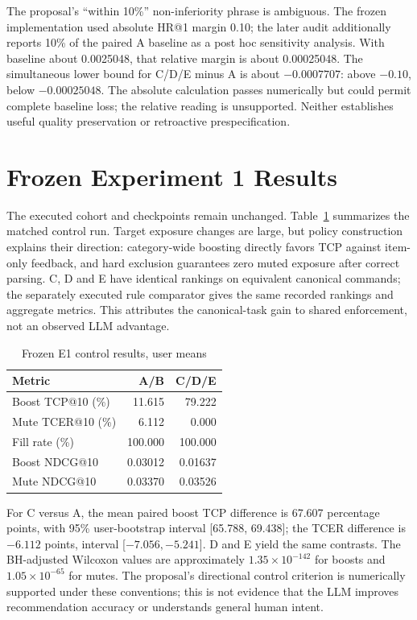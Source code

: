 \documentclass[conference]{IEEEtran}
\begin{document}
The proposal's ``within 10\%'' non-inferiority phrase is ambiguous. The frozen implementation used absolute HR@1 margin 0.10; the later audit additionally reports 10\% of the paired A baseline as a post hoc sensitivity analysis. With baseline about 0.0025048, that relative margin is about 0.00025048. The simultaneous lower bound for C/D/E minus A is about $-0.0007707$: above $-0.10$, below $-0.00025048$. The absolute calculation passes numerically but could permit complete baseline loss; the relative reading is unsupported. Neither establishes useful quality preservation or retroactive prespecification.

\section{Frozen Experiment 1 Results}
The executed cohort and checkpoints remain unchanged. Table~\ref{tab:e1} summarizes the matched control run. Target exposure changes are large, but policy construction explains their direction: category-wide boosting directly favors TCP against item-only feedback, and hard exclusion guarantees zero muted exposure after correct parsing. C, D and E have identical rankings on equivalent canonical commands; the separately executed rule comparator gives the same recorded rankings and aggregate metrics. This attributes the canonical-task gain to shared enforcement, not an observed LLM advantage.

\begin{table}[t]\centering\small
\caption{Frozen E1 control results, user means}\label{tab:e1}
\begin{tabular}{lrr}\toprule
Metric & A/B & C/D/E\\\midrule
Boost TCP@10 (\%) &11.615&79.222\\
Mute TCER@10 (\%) &6.112&0.000\\
Fill rate (\%) &100.000&100.000\\
Boost NDCG@10 &0.03012&0.01637\\
Mute NDCG@10 &0.03370&0.03526\\\bottomrule
\end{tabular}\end{table}

For C versus A, the mean paired boost TCP difference is 67.607 percentage points, with 95\% user-bootstrap interval [65.788, 69.438]; the TCER difference is $-6.112$ points, interval [$-7.056,-5.241$]. D and E yield the same contrasts. The BH-adjusted Wilcoxon values are approximately $1.35\times10^{-142}$ for boosts and $1.05\times10^{-65}$ for mutes. The proposal's directional control criterion is numerically supported under these conventions; this is not evidence that the LLM improves recommendation accuracy or understands general human intent.
\end{document}
